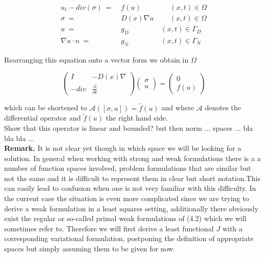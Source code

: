 \documentclass[../draft_1.tex]{subfiles}
\begin{document}
\begin{ceqn}
	\begin{equation}
	\begin{aligned}
	u_t - div(\sigma) \ =& \ f(u) \qquad \qquad (x,t) \in \Omega \\
	\sigma \ =& \ D(x)  \nabla u \ \qquad (x,t) \in \Omega  \\
	u \ =& \ g_D  \ \ \qquad  \qquad (x,t) \in \Gamma_D \\
	\nabla u \cdot n \ =& \ g_N  \ \ \qquad \qquad (x,t) \in \Gamma_N
	\end{aligned}
	\end{equation}
\end{ceqn}
Rearranging this equation onto a vector form we obtain in $\Omega$
\begin{ceqn}
	\begin{equation}
	\begin{pmatrix}
	I & - D(x) \nabla \\
	- div & \frac{\partial}{\partial t} 
	\end{pmatrix}
	\begin{pmatrix}
	\sigma \\
	u
	\end{pmatrix} = 
	\begin{pmatrix}
	0 \\
	f(u)
	\end{pmatrix}
	\end{equation}
\end{ceqn}
which can be shortened to $\mathcal{A} ([\sigma, u]) = \tilde{f}(u)$ and where $\mathcal{A}$ denotes the differential operator and $\tilde{f}(u)$ the right hand side. 
\smallskip
\\
Show that this operator is linear and bounded? but then norm ... spaces ... bla bla bla ...
\smallskip
\\
\textbf{Remark.} It is not clear yet though in which space we will be looking for a solution. In general when working with strong and weak formulations there is a a number of function spaces involved, problem formulations that are similar but not the same and it is difficult to represent them in clear but short notation.This can easily lead to confusion when one is not very familiar with this difficulty. In the current case the situation is even more complicated since we are trying to derive a weak formulation in a least squares setting, additionally there obviously exist the regular or so-called primal weak formulations of (4.2) which we will sometimes refer to. Therefore we will first derive  a least functional $J$ with a corresponding variational formulation, postponing the definition of appropriate spaces but simply assuming them to be given for now. 
\end{document}
